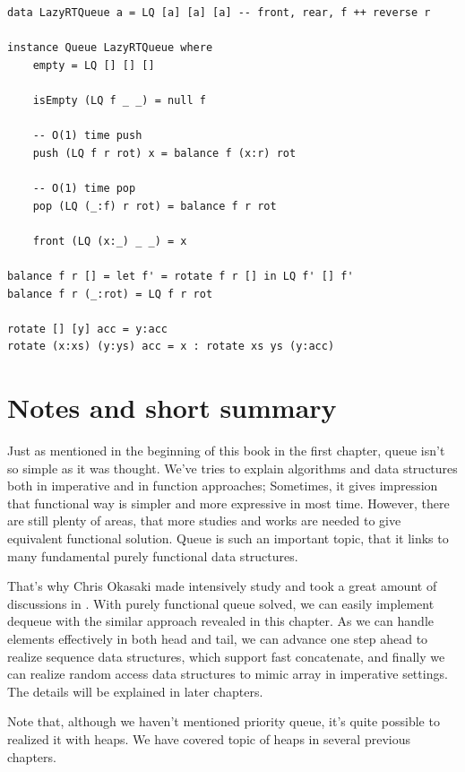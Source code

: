 \documentclass[UTF8]{article}
\begin{document}
\lstset{language=Haskell}
\begin{lstlisting}
data LazyRTQueue a = LQ [a] [a] [a] -- front, rear, f ++ reverse r

instance Queue LazyRTQueue where
    empty = LQ [] [] []

    isEmpty (LQ f _ _) = null f

    -- O(1) time push
    push (LQ f r rot) x = balance f (x:r) rot

    -- O(1) time pop
    pop (LQ (_:f) r rot) = balance f r rot

    front (LQ (x:_) _ _) = x

balance f r [] = let f' = rotate f r [] in LQ f' [] f'
balance f r (_:rot) = LQ f r rot

rotate [] [y] acc = y:acc
rotate (x:xs) (y:ys) acc = x : rotate xs ys (y:acc)
\end{lstlisting}

\section{Notes and short summary}
Just as mentioned in the beginning of this book in the first chapter,
queue isn't so simple as it was thought. We've tries to explain
algorithms and data structures both in imperative and in function
approaches; Sometimes, it gives impression that functional way is
simpler and more expressive in most time. However, there are still
plenty of areas, that more studies and works are needed to give equivalent
functional solution. Queue is such an important topic, that it
links to many fundamental purely functional data structures.

That's why Chris Okasaki made intensively study and took a great
amount of discussions in \cite{okasaki-book}. With purely functional
queue solved, we can easily implement dequeue with the similar
approach revealed in this chapter. As we can handle elements effectively
in both head and tail, we can advance one step ahead to realize
sequence data structures, which support fast concatenate, and
finally we can realize random access data structures to mimic
array in imperative settings. The details will be explained
in later chapters.

Note that, although we haven't mentioned priority queue, it's quite
possible to realized it with heaps. We have covered topic of heaps
in several previous chapters.
\end{document}
